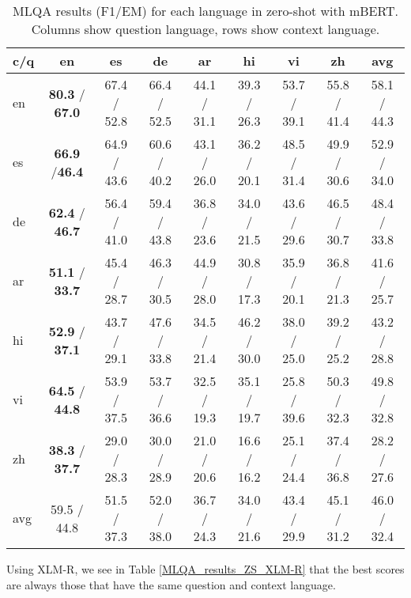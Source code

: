 \documentclass[11pt]{article}
\begin{document}
\begin{table*}[!ht]
    \centering
    \begin{adjustbox}{max width=\textwidth}
    \begin{tabular}{l|ccccccc|c}
    \toprule
        c/q & en & es & de & ar & hi & vi & zh & avg \\ \midrule
        en & \textbf{80.3} / \textbf{67.0} & 67.4 / 52.8 & 66.4 / 52.5 & 44.1 / 31.1 & 39.3 / 26.3 & 53.7 / 39.1 & 55.8 / 41.4 & 58.1 / 44.3 \\
        es & \textbf{66.9} /\textbf{46.4} & 64.9 / 43.6 & 60.6 / 40.2 & 43.1 / 26.0 & 36.2 / 20.1 & 48.5 / 31.4 & 49.9 / 30.6 & 52.9 / 34.0 \\ 
        de & \textbf{62.4} / \textbf{46.7} & 56.4 / 41.0 & 59.4 / 43.8 & 36.8 / 23.6 & 34.0 / 21.5 & 43.6 / 29.6 & 46.5 / 30.7 & 48.4 / 33.8 \\ 
        ar & \textbf{51.1} / \textbf{33.7} & 45.4 / 28.7 & 46.3 / 30.5 & 44.9 / 28.0 & 30.8 / 17.3 & 35.9 / 20.1 & 36.8 / 21.3 & 41.6 / 25.7 \\ 
        hi & \textbf{52.9} / \textbf{37.1} & 43.7 / 29.1 & 47.6 / 33.8 & 34.5 / 21.4 & 46.2 / 30.0 & 38.0 / 25.0 & 39.2 / 25.2 & 43.2 / 28.8 \\ 
        vi & \textbf{64.5} / \textbf{44.8} & 53.9 / 37.5 & 53.7 / 36.6 & 32.5 / 19.3 & 35.1 / 19.7 & 25.8 / 39.6 & 50.3 / 32.3 & 49.8 / 32.8 \\ 
        zh & \textbf{38.3} / \textbf{37.7} & 29.0 / 28.3 & 30.0 / 28.9 & 21.0 / 20.6 & 16.6 / 16.2 & 25.1 / 24.4 & 37.4 / 36.8 & 28.2 / 27.6 \\ \midrule
        avg & 59.5 / 44.8 & 51.5 / 37.3 & 52.0 / 38.0 & 36.7 / 24.3 & 34.0 / 21.6 & 43.4 / 29.9 & 45.1 / 31.2 & 46.0 / 32.4 \\ \bottomrule
    \end{tabular}
    \end{adjustbox}
    \caption{MLQA results (F1/EM) for each language in zero-shot with mBERT. Columns show question language, rows show context language.}
    \label{MLQA_results_ZS_mBERT}
\end{table*}

Using XLM-R, we see in Table \ref{MLQA_results_ZS_XLM-R} that the best scores are always those that have the same question and context language. 
\end{document}
